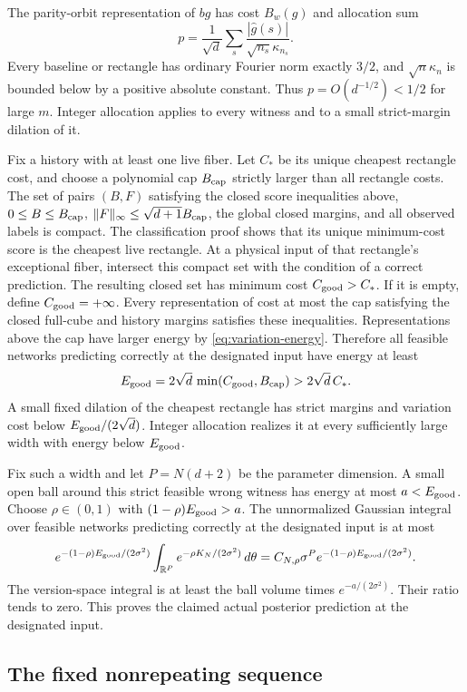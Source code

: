 The parity-orbit representation of $bg$ has cost $B_w(g)$ and
allocation sum
\[
 p=\frac1{\sqrt d}\sum_s
       \frac{|\widehat g(s)|}{\sqrt{n_s}\kappa_{n_s}}.
\]
Every baseline or rectangle has ordinary Fourier norm exactly $3/2$,
and $\sqrt n\kappa_n$ is bounded below by a positive absolute constant.
Thus $p=O(d^{-1/2})<1/2$ for large $m$. Integer allocation applies to
every witness and to a small strict-margin dilation of it.

Fix a history with at least one live fiber. Let $C_*$ be its unique
cheapest rectangle cost, and choose a polynomial cap $B_{\rm cap}$
strictly larger than all rectangle costs. The set of pairs $(B,F)$
satisfying the closed score inequalities above, $0\le B\le B_{\rm cap}$,
$\|F\|_\infty\le\sqrt{d+1}B_{\rm cap}$, the global closed margins,
and all observed labels is compact. The classification proof shows
that its unique minimum-cost score is the cheapest live rectangle.
At a physical input of that rectangle's exceptional fiber, intersect
this compact set with the condition of a correct prediction. The
resulting closed set has minimum cost $C_{\rm good}>C_*$.
If it is empty, define $C_{\rm good}=+\infty$.
Every representation of cost at most the cap satisfying the closed
full-cube and history margins satisfies these inequalities. Representations above the cap have larger energy by
\eqref{eq:variation-energy}. Therefore all feasible networks predicting correctly at the designated input have
energy at least
\[
 E_{\rm good}=2\sqrt d\,\min(C_{\rm good},B_{\rm cap})
              >2\sqrt d\,C_*.
\]
A small fixed dilation of the cheapest rectangle has strict margins
and variation cost below $E_{\rm good}/(2\sqrt d)$. Integer allocation
realizes it at every sufficiently large width with energy below
$E_{\rm good}$.

Fix such a width and let $P=N(d+2)$ be the parameter dimension.
A small open ball around this strict feasible wrong witness has energy
at most $a<E_{\rm good}$. Choose $\rho\in(0,1)$ with
$(1-\rho)E_{\rm good}>a$. The unnormalized Gaussian integral over
feasible networks predicting correctly at the designated input is at most
\[
 e^{-(1-\rho)E_{\rm good}/(2\sigma^2)}
 \int_{\mathbb R^P}e^{-\rho K_N/(2\sigma^2)}\,d\theta
 =C_{N,\rho}\sigma^P e^{-(1-\rho)E_{\rm good}/(2\sigma^2)}.
\]
The version-space integral is at least the ball volume times
$e^{-a/(2\sigma^2)}$. Their ratio tends to zero. This proves the
claimed actual posterior prediction at the designated input.

\subsection{The fixed nonrepeating sequence}

